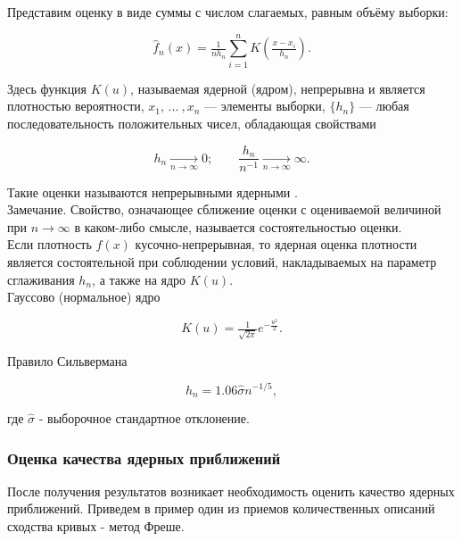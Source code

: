 Представим оценку в виде суммы с числом слагаемых, равным объёму выборки:

\begin{equation}
    \widehat{f}_n(x) = \tfrac{1}{nh_n}\sum\limits_{i=1}^n K\left( \tfrac{x - x_i}{h_n} \right).
\end{equation}

Здесь функция $K(u)$, называемая ядерной (ядром), непрерывна и является плотностью вероятности, $x_1, \, ... \: , x_n$ --- элементы выборки, $\{h_n\}$ --- любая последовательность положительных чисел, обладающая свойствами

\begin{equation}
    h_n \underset{n \to \infty}{\longrightarrow} 0; \qquad \dfrac{h_n}{n^{-1}} \underset{n \to \infty}{\longrightarrow} \infty.
\end{equation}

Такие оценки называются непрерывными ядерными \cite[с. 421-423]{b:probSectMath}.\\

Замечание. Свойство, означающее сближение оценки с оцениваемой величиной при $n \rightarrow \infty$ в каком-либо смысле, называется состоятельностью оценки.\\

Если плотность $f(x)$ кусочно-непрерывная, то ядерная оценка плотности является состоятельной при соблюдении условий, накладываемых на параметр сглаживания $h_n$, а также на ядро $K(u)$.\\

Гауссово (нормальное) ядро \cite[с. 38]{a:nonParamRegr}

\begin{equation}
    K(u) = \tfrac{1}{\sqrt{2\pi}}e^{-\tfrac{u^2}{2}}.
\end{equation}

Правило Сильвермана \cite[с. 44]{a:nonParamRegr}

\begin{equation}
    h_n = 1.06\hat{\sigma}n^{-1/5},
\end{equation}

где $\hat{\sigma}$ - выборочное стандартное отклонение.

\subsubsection{Оценка качества ядерных приближений}

После получения результатов возникает необходимость оценить качество ядерных приближений. Приведем в пример один из приемов количественных описаний сходства кривых - метод Фреше. \\

